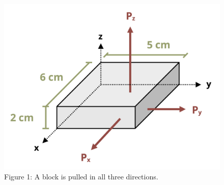 \documentclass[
  letterpaper,
  DIV=11,
  numbers=noendperiod]{scrreprt}
\begin{document}
\begin{figure}[H]

{\centering \includegraphics{images/208.png}

}

\caption{Figure 1: A block is pulled in all three directions.}

\end{figure}%
\end{document}
